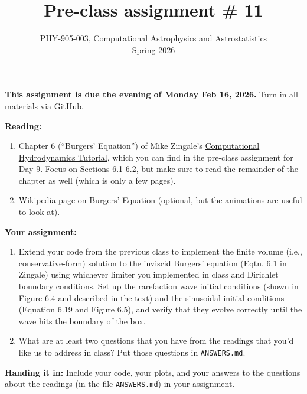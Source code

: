 \documentclass[10pt]{article}
\title{Pre-class assignment \# 11}
\author{PHY-905-003, Computational Astrophysics and
  Astrostatistics\\Spring 2026}
\date{} %
\begin{document}
 
\maketitle

\vspace{-5mm}

\noindent
\textbf{This assignment is due the evening of Monday Feb 16, 2026.}
 Turn in all materials via GitHub.

\vspace{5mm}

\noindent
\textbf{Reading:}

\begin{enumerate}

\item Chapter 6 (``Burgers' Equation'') of Mike Zingale's
\href{https://open-astrophysics-bookshelf.github.io/numerical_exercises/CompHydroTutorial.pdf}{Computational
Hydrodynamics Tutorial}, which you can find in the pre-class
assignment for Day 9.  Focus on Sections 6.1-6.2, but make sure to
read the remainder of the chapter as well (which is only a few pages).

\item
\href{https://en.wikipedia.org/wiki/Burgers%27_equation}{Wikipedia
page on Burgers' Equation} (optional, but the animations are useful to
look at).

\end{enumerate}

\noindent
\textbf{Your assignment:}  


\begin{enumerate}
  
\item Extend your code from the previous class to implement the finite
  volume (i.e., conservative-form) solution to the inviscid Burgers'
  equation (Eqtn. 6.1 in Zingale) using whichever limiter you
  implemented in class and Dirichlet boundary conditions.  Set up the rarefaction wave initial
  conditions (shown in Figure 6.4 and described in the text) and the
  sinusoidal initial conditions (Equation 6.19 and Figure 6.5), and
  verify that they evolve correctly until the wave hits the boundary
  of the box.

\item What are at least two questions that you have from the readings
that you'd like us to address in class?
Put those questions in \texttt{ANSWERS.md}.

\end{enumerate}


\noindent \textbf{Handing it in:} Include your code, your plots, and
your answers to the questions about the readings (in the file \texttt{ANSWERS.md})
in your assignment.
\end{document}
